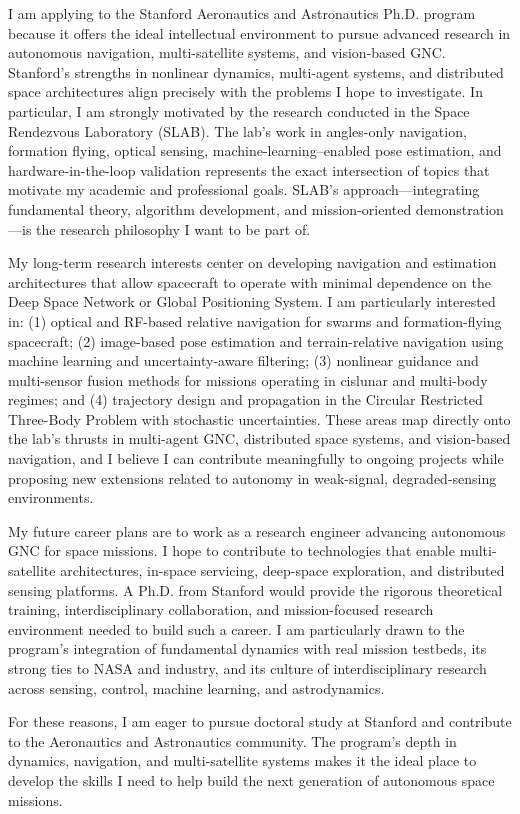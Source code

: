 \documentclass[11pt]{article}
\begin{document}
	I am applying to the Stanford Aeronautics and Astronautics Ph.D. program because it offers the ideal intellectual environment to pursue advanced research in autonomous navigation, multi-satellite systems, and vision-based GNC. Stanford’s strengths in nonlinear dynamics, multi-agent systems, and distributed space architectures align precisely with the problems I hope to investigate. In particular, I am strongly motivated by the research conducted in the Space Rendezvous Laboratory (SLAB). The lab’s work in angles-only navigation, formation flying, optical sensing, machine-learning–enabled pose estimation, and hardware-in-the-loop validation represents the exact intersection of topics that motivate my academic and professional goals. SLAB's approach—integrating fundamental theory, algorithm development, and mission-oriented demonstration—is the research philosophy I want to be part of.
	
	My long-term research interests center on developing navigation and estimation architectures that allow spacecraft to operate with minimal dependence on the Deep Space Network or Global Positioning System. I am particularly interested in: (1) optical and RF-based relative navigation for swarms and formation-flying spacecraft; (2) image-based pose estimation and terrain-relative navigation using machine learning and uncertainty-aware filtering; (3) nonlinear guidance and multi-sensor fusion methods for missions operating in cislunar and multi-body regimes; and (4) trajectory design and propagation in the Circular Restricted Three-Body Problem with stochastic uncertainties. These areas map directly onto the lab’s thrusts in multi-agent GNC, distributed space systems, and vision-based navigation, and I believe I can contribute meaningfully to ongoing projects while proposing new extensions related to autonomy in weak-signal, degraded-sensing environments.
	
	My future career plans are to work as a research engineer advancing autonomous GNC for space missions. I hope to contribute to technologies that enable multi-satellite architectures, in-space servicing, deep-space exploration, and distributed sensing platforms. A Ph.D. from Stanford would provide the rigorous theoretical training, interdisciplinary collaboration, and mission-focused research environment needed to build such a career. I am particularly drawn to the program’s integration of fundamental dynamics with real mission testbeds, its strong ties to NASA and industry, and its culture of interdisciplinary research across sensing, control, machine learning, and astrodynamics.
	
	For these reasons, I am eager to pursue doctoral study at Stanford and contribute to the Aeronautics and Astronautics community. The program’s depth in dynamics, navigation, and multi-satellite systems makes it the ideal place to develop the skills I need to help build the next generation of autonomous space missions.
	
\end{document}
